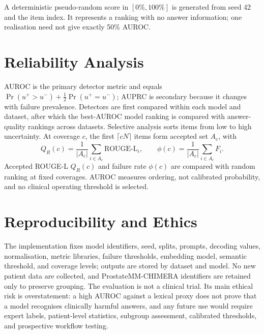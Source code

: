 A deterministic pseudo-random score in $[0\%,100\%]$ is generated from seed 42 and the item index. It represents a ranking with no answer information; one realisation need not give exactly 50\% AUROC.

\section{Reliability Analysis}

AUROC is the primary detector metric and equals $\Pr(u^+>u^-)+\tfrac12\Pr(u^+=u^-)$; AUPRC is secondary because it changes with failure prevalence. Detectors are first compared within each model and dataset, after which the best-AUROC model ranking is compared with answer-quality rankings across datasets. Selective analysis sorts items from low to high uncertainty. At coverage $c$, the first $\lceil cN\rceil$ items form accepted set $A_c$, with
\begin{equation}
Q_R(c)=\frac{1}{|A_c|}\sum_{i\in A_c}\mathrm{ROUGE\mbox{-}L}_i,\qquad
\phi(c)=\frac{1}{|A_c|}\sum_{i\in A_c}F_i.
\end{equation}
Accepted ROUGE-L $Q_R(c)$ and failure rate $\phi(c)$ are compared with random ranking at fixed coverages. AUROC measures ordering, not calibrated probability, and no clinical operating threshold is selected.

\section{Reproducibility and Ethics}

The implementation fixes model identifiers, seed, splits, prompts, decoding values, normalisation, metric libraries, failure thresholds, embedding model, semantic threshold, and coverage levels; outputs are stored by dataset and model. No new patient data are collected, and ProstateMM-CHIMERA identifiers are retained only to preserve grouping. The evaluation is not a clinical trial. Its main ethical risk is overstatement: a high AUROC against a lexical proxy does not prove that a model recognises clinically harmful answers, and any future use would require expert labels, patient-level statistics, subgroup assessment, calibrated thresholds, and prospective workflow testing.
